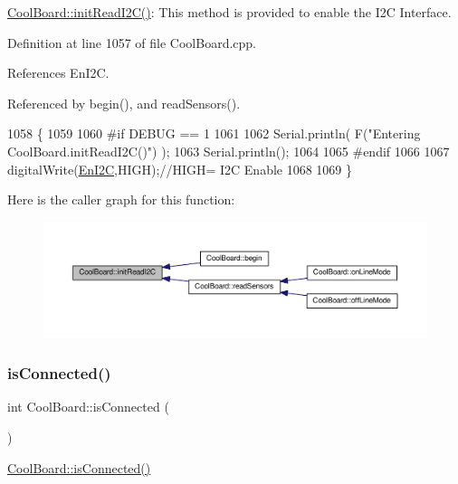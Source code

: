 \hyperlink{classCoolBoard_a397b46fadab8f530a8cf4d914c561366}{Cool\+Board\+::init\+Read\+I2\+C()}\+: This method is provided to enable the I2C Interface. 

Definition at line 1057 of file Cool\+Board.\+cpp.



References En\+I2C.



Referenced by begin(), and read\+Sensors().


\begin{DoxyCode}
1058 \{
1059 
1060 \textcolor{preprocessor}{#if DEBUG == 1}
1061 
1062     Serial.println( F(\textcolor{stringliteral}{"Entering CoolBoard.initReadI2C()"}) );
1063     Serial.println();
1064 
1065 \textcolor{preprocessor}{#endif}
1066  
1067     digitalWrite(\hyperlink{classCoolBoard_af1fe1376fc66f93dee80b327ca695377}{EnI2C},HIGH);\textcolor{comment}{//HIGH= I2C Enable}
1068 
1069 \}
\end{DoxyCode}
Here is the caller graph for this function\+:
\nopagebreak
\begin{figure}[H]
\begin{center}
\leavevmode
\includegraphics[width=350pt]{classCoolBoard_a397b46fadab8f530a8cf4d914c561366_icgraph}
\end{center}
\end{figure}
\mbox{\label{classCoolBoard_ad7442cf4b62c7b0d5bd62a0f75ffc065}} 
\subsubsection{\texorpdfstring{is\+Connected()}{isConnected()}}
{\footnotesize\ttfamily int Cool\+Board\+::is\+Connected (\begin{DoxyParamCaption}{ }\end{DoxyParamCaption})}

\hyperlink{classCoolBoard_ad7442cf4b62c7b0d5bd62a0f75ffc065}{Cool\+Board\+::is\+Connected()}

